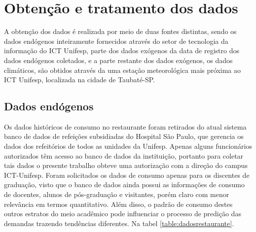    \section{Obtenção e tratamento dos dados}
        A obtenção dos dados é realizada por meio de duas fontes distintas, sendo os dados endógenos inteiramente fornecidos através do setor de tecnologia da informação do ICT Unifesp, parte dos dados exógenos da data de registro dos dados endógenos coletados, e a parte restante dos dados exógenos, os dados climáticos, são obtidos através da uma estação meteorológica mais próxima ao ICT Unifesp, localizada na cidade de Taubaté-SP.
        
	    \subsection{Dados endógenos} \label{subsec:coleta_endogenos}
        	Os dados históricos de consumo no restaurante foram retirados do atual sistema banco de dados de refeições subsidiadas do Hospital São Paulo, que gerencia os dados dos refeitórios de todos as unidades da Unifesp. Apenas alguns funcionários autorizados têm acesso ao banco de dados da instituição, portanto para coletar tais dados o presente trabalho obteve uma autorização com a direção do campus ICT-Unifesp. Foram solicitados  os dados de consumo apenas para os discentes de graduação, visto que  o banco de dados ainda possui as informações de consumo de docentes, alunos de pós-graduação e visitantes, porém claro com menor relevância em termos quantitativo. Além disso, o padrão de consumo destes outros estratos do meio acadêmico pode influenciar  o processo de predição das demandas trazendo tendências diferentes. Na tabel \ref{table:dadosrestaurante}.
    
